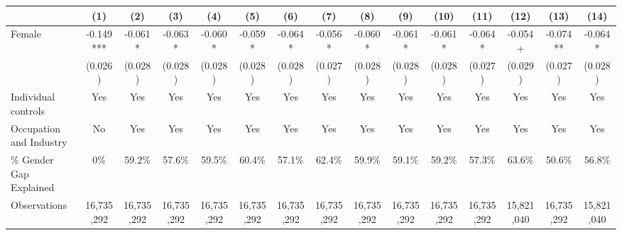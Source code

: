 \begin{tabular}{@{}p{3.8cm}cccccccccccccc@{}}
    \toprule
     & (1) & (2) & (3) & (4) & (5) & (6) & (7) & (8) & (9) & (10) & (11) & (12) & (13) & (14) \\
    \midrule
    Female & -0.149*** & -0.061* & -0.063* & -0.060* & -0.059* & -0.064* & -0.056* & -0.060* & -0.061* & -0.061* & -0.064* & -0.054+ & -0.074** & -0.064* \\
           & (0.026)   & (0.028) & (0.028) & (0.028) & (0.028) & (0.028) & (0.027) & (0.028) & (0.028) & (0.028) & (0.027) & (0.029) & (0.027) & (0.028) \\
    Individual controls & Yes & Yes & Yes & Yes & Yes & Yes & Yes & Yes & Yes & Yes & Yes & Yes & Yes & Yes \\
    Occupation and Industry     & No  & Yes & Yes & Yes & Yes & Yes & Yes & Yes & Yes & Yes & Yes & Yes & Yes & Yes \\
    \% Gender Gap Explained                 & 0\% & 59.2\% & 57.6\% & 59.5\% & 60.4\% & 57.1\% & 62.4\% & 59.9\% & 59.1\% & 59.2\% & 57.3\% & 63.6\% & 50.6\% & 56.8\% \\
    Observations                            & 16,735,292 & 16,735,292 & 16,735,292 & 16,735,292 & 16,735,292 & 16,735,292 & 16,735,292 & 16,735,292 & 16,735,292 & 16,735,292 & 16,735,292 & 15,821,040 & 16,735,292 & 15,821,040 \\
    \bottomrule
    \end{tabular}
    